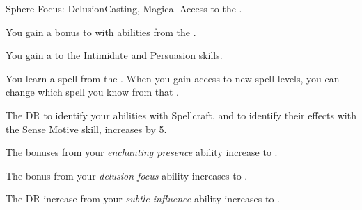     \begin{feat}{Sphere Focus: Delusion}{Casting, Magical}
        \featpre Access to the  .

         You gain a  bonus to  with abilities from the  .

         You gain a   to the Intimidate and Persuasion skills.

         You learn a spell from the  .
        When you gain access to new spell levels, you can change which spell you know from that .

         The DR to identify your  abilities with Spellcraft, and to identify their effects with the Sense Motive skill, increases by 5.

         The bonuses from your \textit{enchanting presence} ability increase to .

         The bonus from your \textit{delusion focus} ability increases to .

         The DR increase from your \textit{subtle influence} ability increases to .
    \end{feat}

